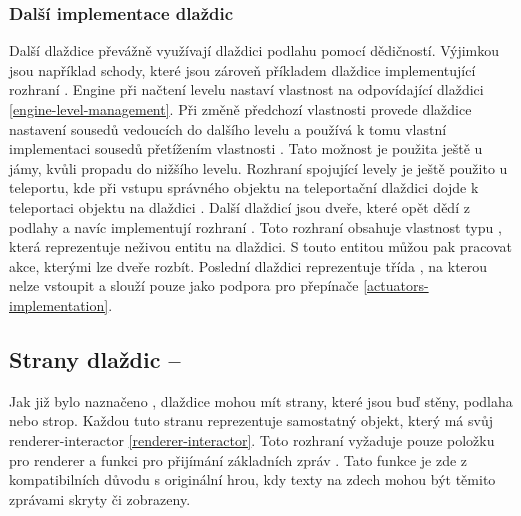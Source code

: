 \subsubsection{Další implementace dlaždic}
Další dlaždice převážně využívají dlaždici podlahu pomocí dědičností. Výjimkou jsou například schody,
které jsou zároveň příkladem dlaždice implementující rozhraní . Engine při načtení 
levelu nastaví vlastnost  na odpovídající dlaždici \vref{engine-level-management}.
Při změně předchozí vlastnosti provede dlaždice nastavení sousedů vedoucích do dalšího levelu a používá k tomu vlastní 
implementaci sousedů přetížením vlastnosti . Tato možnost je použita ještě u jámy, kvůli propadu do nižšího levelu. 
Rozhraní spojující levely je ještě použito u teleportu, kde při vstupu správného objektu na teleportační dlaždici 
dojde k teleportaci objektu na dlaždici . Další dlaždicí jsou dveře, které opět 
dědí z podlahy a navíc implementují rozhraní . Toto rozhraní obsahuje vlastnost typu ,
která reprezentuje neživou entitu na dlaždici. S touto entitou můžou pak pracovat akce, kterými lze dveře rozbít.
Poslední dlaždici reprezentuje třída , na kterou nelze vstoupit a slouží pouze jako podpora
pro přepínače \vref{actuators-implementation}.

\subsection{Strany dlaždic -- }\label{tile-sides-section}
Jak již bylo naznačeno , dlaždice mohou mít strany, které jsou buď stěny, podlaha nebo strop.
Každou tuto stranu reprezentuje samostatný objekt, který má svůj renderer-interactor \vref{renderer-interactor}. 
Toto rozhraní vyžaduje pouze položku pro renderer a funkci pro přijímání základních zpráv . 
Tato funkce je zde z kompatibilních důvodu s originální hrou, kdy texty na zdech mohou být těmito 
zprávami skryty či zobrazeny.


